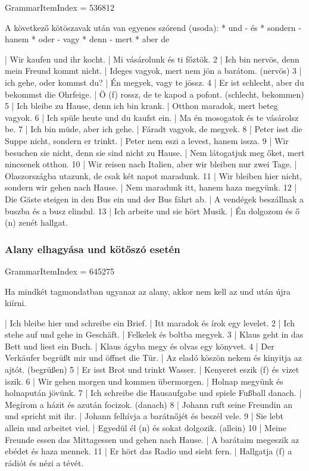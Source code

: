 \documentclass{article}
\newenvironment{desc}{\verbatim}{\endverbatim}
\newenvironment{exmp}{\verbatim}{\endverbatim}
\begin{document}
GrammarItemIndex = 536812

\begin{desc}
A következő kötöszavak után van egyenes szórend (usoda):
* und - és
* sondern - hanem
* oder - vagy
* denn - mert
* aber  de
\end{desc}

\begin{exmp}
1 | Wir kaufen und ihr kocht. | Mi vásárolunk és ti főztök.
2 | Ich bin nervös, denn mein Freund kommt nicht. | Ideges vagyok, mert nem jön a barátom. (nervös)
3 | ich gehe, oder kommst du? | Én megyek, vagy te jössz.
4 | Er ist schlecht, aber du bekommst die Ohrfeige. | Ö (f) rossz, de te kapod a pofont. (schlecht, bekommen)
5 | Ich bleibe zu Hause, denn ich bin krank. | Otthon maradok, mert beteg vagyok.
6 | Ich spüle heute und du kaufst ein. | Ma én mosogatok és te vásárolsz be.
7 | Ich bin müde, aber ich gehe. | Fáradt vagyok, de megyek.
8 | Peter isst die Suppe nicht, sondern er trinkt. | Peter nem eszi a levest, hanem issza.
9 | Wir besuchen sie nicht, denn sie sind nicht zu Hause. | Nem látogatjuk meg őket, mert nincsenek otthon.
10 | Wir reisen nach Italien, aber wir bleiben nur zwei Tage. | Olaszországba utazunk, de csak két napot maradunk.
11 | Wir bleiben hier nicht, sondern wir gehen nach Hause. | Nem maradunk itt, hanem haza megyünk.
12 | Die Gäste steigen in den Bus ein und der Bus fährt ab. | A vendégek beszállnak a buszba és a busz elindul.
13 | Ich arbeite und sie hört Musik. | Én dolgozom és ő (n) zenét hallgat.
\end{exmp}

\subsubsection{Alany elhagyása und kötőszó esetén}

GrammarItemIndex = 645275

\begin{desc}
Ha mindkét tagmondatban ugyanaz az alany, akkor nem kell az und után újra kiírni.
\end{desc}

\begin{exmp}
1 | Ich bleibe hier und schreibe ein Brief. | Itt maradok és írok egy levelet.
2 | Ich stehe auf und gehe in Geschäft. | Felkelek és boltba megyek.
3 | Klaus geht in das Bett und liest ein Buch. | Klaus ágyba megy és olvas egy könyvet.
4 | Der Verkäufer begrüßt mir und öffnet die Tür. | Az eladó köszön nekem és kinyitja az ajtót. (begrüßen)
5 | Er isst Brot und trinkt Wasser. | Kenyeret eszik (f) és vizet iszik.
6 | Wir gehen morgen und kommen übermorgen. | Holnap megyünk és holnapután jövünk.
7 | Ich schreibe die Hausaufgabe und spiele Fußball danach. | Megírom a házit és azután focizok. (danach)
8 | Johann ruft seine Freundin an und spricht mit ihr. | Johann felhívja a barátnőjét és beszél vele.
9 | Sie lebt allein und arbeitet viel. | Egyedül él (n) és sokat dolgozik. (allein)
10 | Meine Freunde essen das Mittagessen und gehen nach Hause. | A barátaim megeszik az ebédet és haza mennek.
11 | Er hört das Radio und sieht fern. | Hallgatja (f) a rádiót és nézi a tévét.
\end{exmp}
\end{document}

